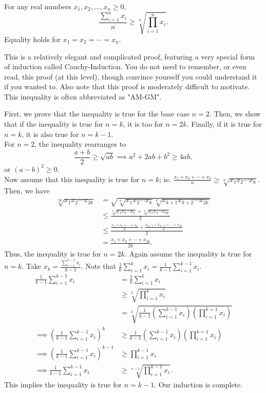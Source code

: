 \documentclass{article}
\begin{document}
\begin{theo} 
For any real numbers $x_1,x_2,\ldots,x_n\ge0$, \[\frac{\sum_{i=1}^nx_i}n\ge\sqrt[n]{\prod_{i=1}^nx_i}. \] Equality holds for $x_1=x_2=\cdots=x_n$. 
\end{theo}
This is a relatively elegant and complicated proof, featuring a very special form of induction called Cauchy-Induction. You do not need to remember, or even read, this proof (at this level), though convince yourself you could understand it if you wanted to. Also note that this proof is moderately difficult to motivate. This inequality is often abbreviated as "AM-GM".  
\begin{pro}
First, we prove that the inequality is true for the base case $n=2$. Then, we show that if the inequality is true for $n=k$, it is too for $n=2k$. Finally, if it is true for $n=k$, it is also true for $n=k-1$.
\\[1\baselineskip]
For $n=2$, the inequality rearranges to \[\frac{a+b}2\ge\sqrt{ab}\implies a^2+2ab+b^2\ge 4ab,\] or $(a-b)^2\ge0$.
\\[1\baselineskip]
Now assume that this inequality is true for $n=k$; ie. $\frac{x_1+x_2+\cdots+x_k}n\ge\sqrt[n]{x_1x_2\cdots x_k}$. Then, we have
\begin{align*}
\sqrt[2k]{x_1x_2\cdots x_{2k}}&=\sqrt{\sqrt[n]{x_1x_2\cdots x_{k}}\sqrt[k]{x_{k+1}x_{k+2}\cdots x_{2k}}}\\&\le \frac{\sqrt[k]{x_1x_2\cdots x_k}+ \sqrt[k]{x_1x_2\cdots x_{2k}}}2\\&\le \frac{\frac{x_1+x_2+\cdots+x_k}k+\frac{x_{k+1}+x_{k+2}+\cdots+x_{2k}}k}2\\&=\frac{x_1+x_2+\cdots+x_{2k}}{2k}.
\end{align*}
Thus, the inequality is true for $n=2k$. 
Again assume the inequality is true for $n=k$. Take $x_k=\frac{\sum\limits_{i=1}^{k-1}x_i}{k-1}$. Note that $\frac1k\sum\limits_{i=1}^kx_i=\frac1{k-1}\sum\limits_{i=1}^{k-1}x_i$. 
\begin{align*}
    \frac1{k-1}\sum_{i=1}^{k-1}x_i&=\frac1k\sum_{i=1}^kx_i\\&\ge \sqrt[k]{\prod_{i=1}^kx_i}\\&=\sqrt[k]{\frac{1}{k-1}\left(\sum_{i=1}^{k-1}x_i\right)\left(\prod_{i=1}^{k=1}x_i\right)}\\\implies \left(\frac1{k-1}\sum_{i=1}^{k-1}x_i\right)^{k}&\ge\frac{1}{k-1}\left(\sum_{i=1}^{k-1}x_i\right)\left(\prod_{i=1}^{k=1}x_i\right)\\\implies \left(\frac1{k-1}\sum_{i=1}^{k-1}x_i\right)^{k-1}&\ge \prod_{i=1}^{k-1}x_i\\\implies \frac1{k-1}\sum_{i=1}^{k-1}x_i&\ge \sqrt[n-1]{\prod_{i=1}^{k-1}x_i}.
\end{align*}
This implies the inequality is true for $n=k-1$. Our induction is complete. 
\end{pro}
\end{document}
